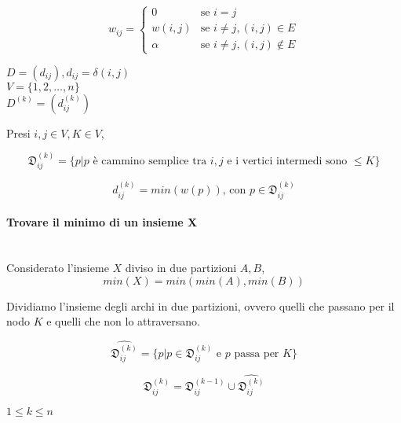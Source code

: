 \begin{equation}
w_{ij} =
\begin{cases}
0 & \mbox{se } i=j \\
w(i,j) & \mbox{se } i\neq j, (i,j) \in E \\
\alpha & \mbox{se } i\neq j, (i,j) \notin E
\end{cases}
\end{equation}

$D=(d_{ij}), d_{ij} = \delta(i,j)$ \\
$V=\{1,2,\ldots,n\}$ \\
$D^{(k)} = (d_{ij}^{(k)})$


Presi $i,j \in V, K \in V$,

\begin{equation}
\mathfrak{D}_{ij}^{(k)} = \{p | p \mbox{ è cammino semplice tra } i,j \mbox{ e i vertici intermedi sono }\leq K \}
\end{equation}

\begin{equation}
d_{ij}^{(k)} = min(w(p))\mbox{, con }p \in \mathfrak{D}_{ij}^{(k)}
\end{equation}

\begin{framed}
\paragraph{Trovare il minimo di un insieme X} \\
Considerato l'insieme $X$ diviso in due partizioni $A,B$,
\begin{equation}
min(X) = min(min(A),min(B))
\end{equation}
\end{framed}


Dividiamo l'insieme degli archi in due partizioni, ovvero quelli che passano per il nodo $K$ e quelli che non lo attraversano.

\begin{equation}
\hat{\mathfrak{D}_{ij}^{(k)}} = \{p | p \in \mathfrak{D}_{ij}^{(k)} \mbox{ e } p \mbox{ passa per } K \}
\end{equation}

\begin{equation}
\mathfrak{D}_{ij}^{(k)} = \mathfrak{D}_{ij}^{(k-1)} \cup \hat{\mathfrak{D}_{ij}^{(k)}}
\end{equation}

$1 \leq k \leq n$

